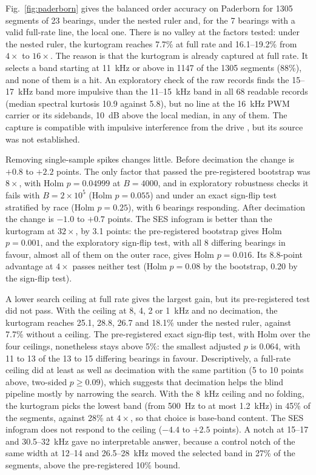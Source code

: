 Fig.~\ref{fig:paderborn} gives the balanced order accuracy on Paderborn for 1305 segments of 23
bearings, under the nested ruler and, for the 7 bearings with a valid full-rate line, the local one.
There is no valley at the factors tested: under the nested ruler, the kurtogram reaches 7.7\% at
full rate and 16.1--19.2\% from $4\times$ to $16\times$. The reason is that the kurtogram is already
captured at full rate. It selects a band starting at 11~kHz or above in 1147 of the 1305 segments
(88\%), and none of them is a hit. An exploratory check of the raw records finds the 15--17~kHz band
more impulsive than the 11--15~kHz band in all 68 readable records (median spectral kurtosis 10.9
against 5.8), but no line at the 16~kHz PWM carrier or its sidebands, 10~dB above the local median,
in any of them. The capture is compatible with impulsive interference from the drive
\citep{smith2016emi}, but its source was not established.

Removing single-sample spikes changes little. Before decimation the change is $+0.8$ to $+2.2$
points. The only factor that passed the pre-registered bootstrap was $8\times$, with Holm
$p = 0.04999$ at $B = 4000$, and in exploratory robustness checks it fails with $B = 2\times10^{5}$
(Holm $p = 0.055$) and under an exact sign-flip test stratified by race (Holm $p = 0.25$), with 6
bearings responding. After decimation the change is $-1.0$ to $+0.7$ points. The SES infogram is
better than the kurtogram at $32\times$, by 3.1 points: the pre-registered bootstrap gives Holm
$p = 0.001$, and the exploratory sign-flip test, with all 8 differing bearings in favour, almost all
of them on the outer race, gives Holm $p = 0.016$. Its 8.8-point advantage at $4\times$ passes neither test (Holm $p = 0.08$ by the
bootstrap, 0.20 by the sign-flip test).

A lower search ceiling at full rate gives the largest gain, but its pre-registered test did not
pass. With the ceiling at 8, 4, 2 or 1~kHz and no decimation, the kurtogram reaches 25.1, 28.8, 26.7
and 18.1\% under the nested ruler, against 7.7\% without a ceiling. The pre-registered exact
sign-flip test, with Holm over the four ceilings, nonetheless stays above 5\%: the smallest adjusted
$p$ is 0.064, with 11 to 13 of the 13 to 15 differing bearings in favour. Descriptively, a full-rate
ceiling did at least as well as decimation with the same partition (5 to 10 points above,
two-sided $p \geq 0.09$), which suggests that decimation helps the blind pipeline mostly by
narrowing the search. With the 8~kHz ceiling and no folding, the kurtogram picks the lowest band
(from 500~Hz to at most 1.2~kHz) in 45\% of the segments, against 28\% at $4\times$, so that choice
is base-band content. The SES infogram does not respond to the ceiling ($-4.4$ to $+2.5$ points). A
notch at 15--17 and 30.5--32~kHz gave no interpretable answer, because a control notch of the same
width at 12--14 and 26.5--28~kHz moved the selected band in 27\% of the segments, above the
pre-registered 10\% bound.

